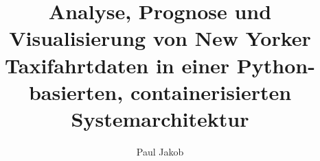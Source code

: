 \documentclass[envcountsame, envcountchap, deutsch, bibtotoc]{i-studis}
\begin{document}
\setcounter{secnumdepth}{2}
\title{Analyse, Prognose und Visualisierung von New Yorker Taxifahrtdaten in einer Python-basierten, containerisierten Systemarchitektur}
\address{im Studiengang Wirtschaftsinformatik an der\\Hochschule Trier}

\author{Paul Jakob}

\mytitlepage

\frontmatter
\tableofcontents						%
\listoffigures                        %
\listoftables                           %
\mainmatter




\backmatter
\printbibliography
\printindex												%
\begin{appendix}
\end{appendix}
\end{document}

